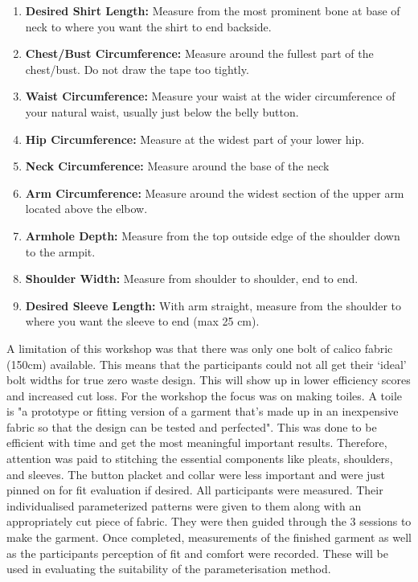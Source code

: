 \begin{enumerate}
    \item \textbf{Desired Shirt Length:} Measure from the most prominent bone at base of neck to where you want the shirt to end backside.
    \item \textbf{Chest/Bust Circumference:} Measure around the fullest part of the chest/bust. Do not draw the tape too tightly.
    \item \textbf{Waist Circumference:} Measure your waist at the wider circumference of your natural waist, usually just below the belly button.
    \item \textbf{Hip Circumference:} Measure at the widest part of your lower hip.
    \item \textbf{Neck Circumference:} Measure around the base of the neck
    \item \textbf{Arm Circumference:} Measure around the widest section of the upper arm located above the elbow.
    \item \textbf{Armhole Depth:} Measure from the top outside edge of the shoulder down to the armpit.
    \item \textbf{Shoulder Width:} Measure from shoulder to shoulder, end to end.
    \item \textbf{Desired Sleeve Length:} With arm straight, measure from the shoulder to where you want the sleeve to end (max 25 cm).
\end{enumerate}

A limitation of this workshop was that there was only one bolt of calico fabric (150cm) available. This means that the participants could not all get their ‘ideal’ bolt widths for true zero waste design. This will show up in lower efficiency scores and increased cut loss.
\newline
For the workshop the focus was on making toiles. A toile is "a prototype or fitting version of a garment that's made up in an inexpensive fabric so that the design can be tested and perfected". This was done to be efficient with time and get the most meaningful important results. Therefore, attention was paid to stitching the essential components like pleats, shoulders, and sleeves. The button placket and collar were less important and were just pinned on for fit evaluation if desired.
\newline
All participants were measured. Their individualised parameterized patterns were given to them along with an appropriately cut piece of fabric. They were then guided through the 3 sessions to make the garment. Once completed, measurements of the finished garment as well as the participants perception of fit and comfort were recorded. These will be used in evaluating the suitability of the parameterisation method.

